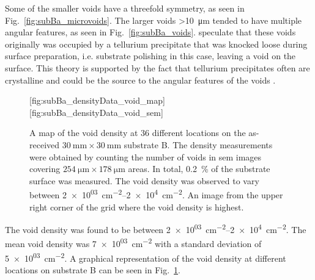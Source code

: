 Some of the smaller voids have a threefold symmetry, as seen in Fig.~\ref{fig:subBa_microvoids}. The larger voids \SI{>10}{\micro\metre} tended to have multiple angular features, as seen in Fig.~\ref{fig:subBa_voids}. \citet{reddy2013cross} speculate that these voids originally was occupied by a tellurium precipitate that was knocked loose during surface preparation, i.e. substrate polishing in this case, leaving a void on the surface. This theory is supported by the fact that tellurium precipitates often are crystalline and could be the source to the angular features of the voids \citep{wang2008observation}.

\begin{figure}[htbp]
    \centering
        [fig:subBa_densityData_void_map]
        \hfill
        [fig:subBa_densityData_void_sem]
    \caption[Map of the void density on the as-received substrate B.]{ A map of the void density at 36 different locations on the as-received $\SI{30}{\milli\metre}\times\SI{30}{\milli\metre}$ substrate B. The density measurements were obtained by counting the number of voids in \ac{sem} images covering $\SI{254}{\micro\metre}\times\SI{178}{\micro\metre}$ areas. In total, \SI{0.2}{\percent} of the substrate surface was measured. The void density was observed to vary between \SIrange{2e+03}{2e+4}{\centi\metre^{-2}}.  An image from the upper right corner of the grid where the void density is highest.}
    \label{fig:subBa_densityData_voids}
\end{figure}

The void density was found to be between \SIrange{2e+03}{2e+4}{\centi\metre^{-2}}. The mean void density was \SI{7e+03}{\centi\metre^{-2}} with a standard deviation of \SI{5e+03}{\centi\metre^{-2}}. A graphical representation of the void density at different locations on substrate B can be seen in Fig.~\ref{fig:subBa_densityData_voids}.

